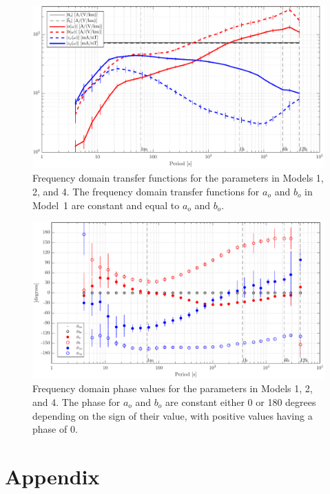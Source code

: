 \documentclass[draft,linenumbers]{agujournal2018}
\begin{document}
\begin{figure}[h]
\centering
\includegraphics[width=\textwidth]{figures/plot_model_summary_Z-options-1.pdf}
\caption{Frequency domain transfer functions for the parameters in Models 1, 2, and 4. The frequency domain transfer functions for $a_o$ and $b_o$ in Model~1 are constant and equal to $a_o$ and $b_o$.}
\label{Z}
\end{figure}

\begin{figure}[h]
\centering
\includegraphics[width=\textwidth]{figures/plot_model_summary_Phi-options-1.pdf}
\caption{Frequency domain phase values for the parameters in Models 1, 2, and 4. The phase for $a_o$ and $b_o$ are constant either 0 or 180 degrees depending on the sign of their value, with positive values having a phase of 0.}
\label{Phi}
\end{figure}

\clearpage

\appendix
\section{Appendix}
\end{document}
